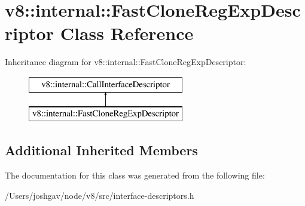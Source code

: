 \hypertarget{classv8_1_1internal_1_1_fast_clone_reg_exp_descriptor}{}\section{v8\+:\+:internal\+:\+:Fast\+Clone\+Reg\+Exp\+Descriptor Class Reference}
\label{classv8_1_1internal_1_1_fast_clone_reg_exp_descriptor}
Inheritance diagram for v8\+:\+:internal\+:\+:Fast\+Clone\+Reg\+Exp\+Descriptor\+:\begin{figure}[H]
\begin{center}
\leavevmode
\includegraphics[height=2.000000cm]{classv8_1_1internal_1_1_fast_clone_reg_exp_descriptor}
\end{center}
\end{figure}
\subsection*{Additional Inherited Members}


The documentation for this class was generated from the following file\+:\begin{DoxyCompactItemize}
\item 
/\+Users/joshgav/node/v8/src/interface-\/descriptors.\+h\end{DoxyCompactItemize}
